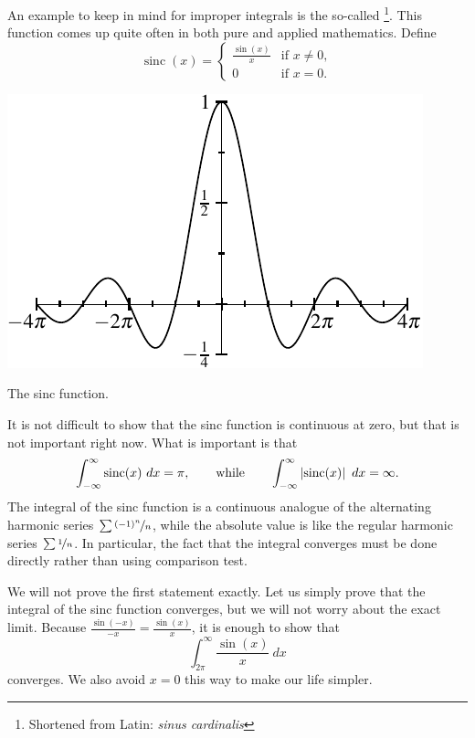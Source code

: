 \begin{example}
An example to keep in mind for improper integrals
is the so-called \emph{}%
\footnote{Shortened from Latin: \emph{sinus cardinalis}}.
This function comes up quite often
in both pure and applied mathematics.  Define
\begin{equation*}
\operatorname{sinc}(x) =
\begin{cases}
\frac{\sin(x)}{x} & \text{if $x \not= 0$} , \\
0 & \text{if $x = 0$} .
\end{cases}
\end{equation*}
\begin{myfigureht}
\includegraphics{figures/sincfig}
\caption{The sinc function.
\label{figsinc}}
\end{myfigureht}

It is not difficult to show that
the sinc function is continuous at zero, but that is
not important right now.  What is important is that
\begin{equation*}
\int_{-\infty}^\infty \operatorname{sinc}(x) ~dx = \pi ,
\qquad \text{while} \qquad
\int_{-\infty}^\infty \left\lvert {\operatorname{sinc}(x)} \right\rvert ~dx = \infty .
\end{equation*}
The integral of the sinc function is a continuous analogue of the
alternating harmonic series $\sum \nicefrac{{(-1)}^n}{n}$, while the
absolute value is like the regular harmonic series $\sum \nicefrac{1}{n}$.
In particular, the fact that the integral converges must be done directly
rather than using comparison test.

We will not prove the first statement exactly.  Let us simply prove
that the integral of the sinc function converges, but we will not worry
about the exact limit.  Because $\frac{\sin(-x)}{-x} = \frac{\sin(x)}{x}$, it is
enough to show that
\begin{equation*}
\int_{2\pi}^\infty \frac{\sin(x)}{x}~dx
\end{equation*}
converges.  We
also avoid $x=0$ this way to make our life simpler.


\end{example}
